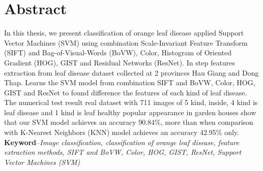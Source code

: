 \chapter*{\Huge Abstract}
In this thesis, we present classification of orange leaf disease applied Support Vector Machines (SVM) using combination Scale-Invariant Feature Transform (SIFT) and Bag-of-Visual-Words (BoVW), Color, Histogram of Oriented Gradient (HOG), GIST and Residual Networks (ResNet). In step features extraction from leaf disease dataset collected at 2 provinces Hau Giang and Dong Thap. Learns the SVM model from combination SIFT and BoVW, Color, HOG, GIST and ResNet to found difference the features of each kind of leaf disease. The numerical test result real dataset with 711 images of 5 kind, inside, 4 kind is leaf disease and 1 kind is leaf healthy popular appearance in garden houses show that our SVM model achieves an accuracy 90.84\%, more than when comparison with K-Nearest Neighbors (KNN) model achieves an accuracy 42.95\% only.\\

\noindent \textbf{Keyword}--\emph{Image  classification, classification of orange leaf disease, feature extraction methods, SIFT and BoVW, Color, HOG, GIST, ResNet, Support Vector Machines (SVM)}